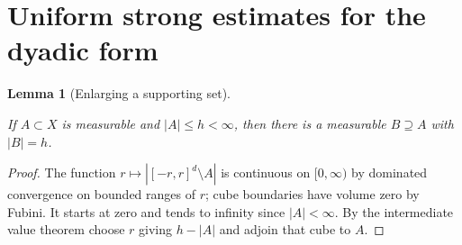 \documentclass[11pt,letterpaper]{article}
\newtheorem{lemma}[theorem]{Lemma}
\theoremstyle{definition}
\providecommand{\lean}[1]{}
\begin{document}
\section{Uniform strong estimates for the dyadic form}
\begin{lemma}[Enlarging a supporting set]\label{bp:pad}
\lean{TwistedParaproduct.pad}
If \(A\subset X\) is measurable and \(|A|\le h<\infty\), then there
is a measurable \(B\supseteq A\) with \(|B|=h\).
\end{lemma}
\begin{proof}
The function \(r\mapsto|[-r,r]^d\setminus A|\) is continuous on
\([0,\infty)\) by dominated convergence on bounded ranges of \(r\);
cube boundaries have volume zero by Fubini. It starts at zero and
tends to infinity since \(|A|<\infty\). By the intermediate value
theorem choose \(r\) giving \(h-|A|\) and adjoin that cube to \(A\).
\end{proof}
\end{document}

